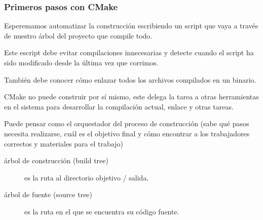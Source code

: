 \begin{frame}
	\frametitle{Primeros pasos con CMake}
	Esperemamos automatizar la construcción escribiendo un script que vaya a través
	de nuestro árbol del proyecto que compile todo.

	Este escript debe evitar compilaciones innecesarias y detecte cuando el script ha sido modificado
	desde la última vez que corrimos.

	También debe conocer cómo enlazar todos los archivos compilados en un binario.

	CMake no puede construir por sí mismo, este delega la tarea a otras herramientas
	en el sistema para desarrollar la compilación actual, enlace y otras tareas.

	Puede pensar como el orquestador del proceso de construcción
	(sabe qué pasos necesita realizarse, cuál es el objetivo final y cómo encontrar a los
	trabajadores correctos y materiales para el trabajo)
	
	\begin{description}
		\item[árbol de construcción (build tree)]

		es la ruta al directorio objetivo / salida.

		\item[árbol de fuente (source tree)]

		es la ruta en el que se encuentra su código fuente.
	\end{description}
\end{frame}

